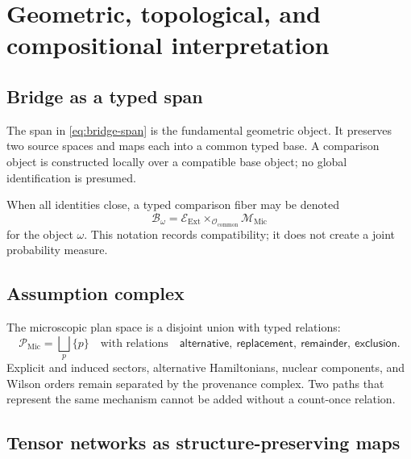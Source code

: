 \documentclass[11pt]{article}
\newcommand{\cO}{\mathcal O}
\newcommand{\cM}{\mathcal M}
\newcommand{\cB}{\mathcal B}
\newcommand{\cE}{\mathcal E}
\newcommand{\cP}{\mathcal P}
\newcommand{\Ext}{\ensuremath{\mathrm{Ext}}}
\newcommand{\Mic}{\ensuremath{\mathrm{Mic}}}
\begin{document}
\section{Geometric, topological, and compositional interpretation}
\label{sec:geometry}

\subsection{Bridge as a typed span}

The span in \cref{eq:bridge-span} is the fundamental geometric object.  It preserves two source spaces and maps each into a common typed base.  A comparison object is constructed locally over a compatible base object; no global identification is presumed.

\begin{center}
\end{center}

When all identities close, a typed comparison fiber may be denoted
\begin{equation}
 \cB_{\omega}
 =
 \cE_{\Ext}\times_{\cO_{\mathrm{common}}}\cM_{\Mic}
 \label{eq:typed-fiber}
\end{equation}
for the object \(\omega\).  This notation records compatibility; it does not create a joint probability measure.

\subsection{Assumption complex}

The microscopic plan space is a disjoint union with typed relations:
\begin{equation}
 \cP_{\Mic}
 =
 \bigsqcup_{p}\{p\}
 \quad\text{with relations}\quad
 \mathsf{alternative},\ \mathsf{replacement},\ \mathsf{remainder},\ \mathsf{exclusion}.
 \label{eq:assumption-complex}
\end{equation}
Explicit and induced sectors, alternative Hamiltonians, nuclear components, and Wilson orders remain separated by the provenance complex.  Two paths that represent the same mechanism cannot be added without a count-once relation.

\subsection{Tensor networks as structure-preserving maps}
\end{document}
